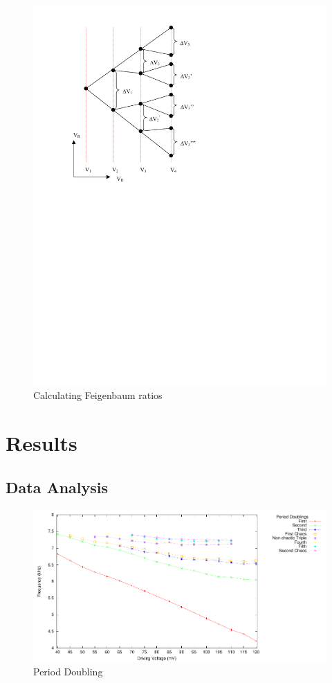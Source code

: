 \documentclass[12pt]{report}
\begin{document}
	\begin{figure}
		\centering
		\includegraphics{Pics/BifurcationDiagramSmall.pdf}
		\caption{Calculating Feigenbaum ratios}
		\label{fig: Calculating Feigenbaum ratios}
	\end{figure}
\chapter{Results}

\section{Data Analysis} %
\label{sec:Data Analysis}

	\begin{figure}[h]
		\centering
		\includegraphics{plots/general.pdf}
		\caption{Period Doubling}
		\label{fig:periodDoubling}
	\end{figure}
\end{document}
